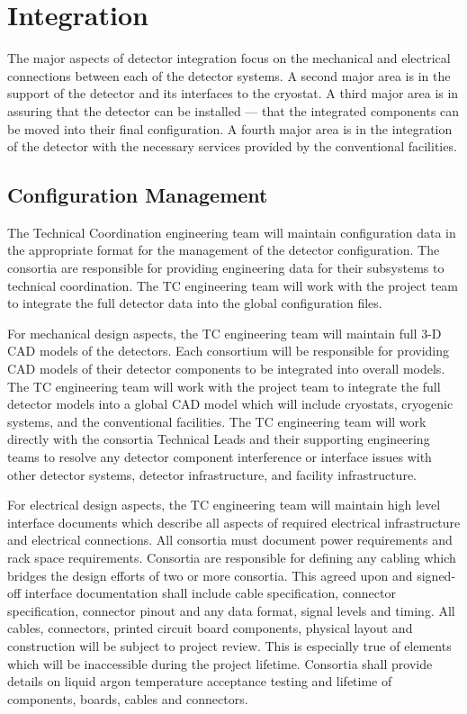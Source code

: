 \section{Integration}
\label{sec:fdsp-coord-integ-sysengr}

The major aspects of detector integration focus on the mechanical and
electrical connections between each of the detector systems. A second
major area is in the support of the detector and its interfaces to the
cryostat. A third major area is in assuring that the detector can be
installed --- that the integrated components can be moved into their
final configuration. A fourth major area is in the integration of the
detector with the necessary services provided by the conventional
facilities.

\subsection{Configuration Management}
\label{sec:fdsp-coord-integ-config}

The  Technical Coordination engineering team will maintain
configuration data in the appropriate format for the management of the
detector configuration. The consortia are responsible for providing
engineering data for their subsystems to technical coordination. The
TC engineering team will work with the  project team to
integrate the full detector data into the global 
configuration files.

For mechanical design aspects, the  TC engineering team
will maintain full 3-D CAD models of the detectors. Each consortium
will be responsible for providing CAD models of their detector
components to be integrated into overall models. The TC engineering
team will work with the  project team to integrate the
full detector models into a global  CAD model which will
include cryostats, cryogenic systems, and the conventional
facilities. The TC engineering team will work directly with the
consortia Technical Leads and their supporting engineering teams to
resolve any detector component interference or interface issues with
other detector systems, detector infrastructure, and facility
infrastructure.

For electrical design aspects, the TC engineering team will maintain
high level interface documents which describe all aspects of required
electrical infrastructure and electrical connections. All consortia
must document power requirements and rack space
requirements. Consortia are responsible for defining any cabling which
bridges the design efforts of two or more consortia. This agreed upon
and signed-off interface documentation shall include cable
specification, connector specification, connector pinout and any data
format, signal levels and timing. All cables, connectors, printed
circuit board components, physical layout and construction will be
subject to project review. This is especially true of elements which
will be inaccessible during the project lifetime. Consortia shall
provide details on liquid argon temperature acceptance testing and
lifetime of components, boards, cables and connectors.


